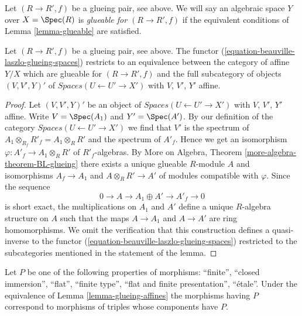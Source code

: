 \noindent
Let $(R \to R', f)$ be a glueing pair, see above.
We will say an algebraic space $Y$ over $X = \Spec(R)$
is {\it glueable for $(R \to R', f)$}
if the equivalent conditions of Lemma \ref{lemma-glueable}
are satisfied.

\begin{lemma}
\label{lemma-glueing-affines}
Let $(R \to R', f)$ be a glueing pair, see above.
The functor (\ref{equation-beauville-laszlo-glueing-spaces})
restricts to an equivalence between the category of affine
$Y/X$ which are glueable for $(R \to R', f)$ and the
full subcategory of objects $(V, V', Y)'$ of
$\textit{Spaces}(U \leftarrow U' \to X')$
with $V$, $V'$, $Y'$ affine.
\end{lemma}

\begin{proof}
Let $(V, V', Y)'$ be an object of
$\textit{Spaces}(U \leftarrow U' \to X')$
with $V$, $V'$, $Y'$ affine.
Write $V = \Spec(A_1)$ and $Y' = \Spec(A')$. By our definition of the
category $\textit{Spaces}(U \leftarrow U' \to X')$ we find that
$V'$ is the spectrum of $A_1 \otimes_{R_f} R'_f = A_1 \otimes_R R'$
and the spectrum of $A'_f$. Hence we get an isomorphism
$\varphi : A'_f \to A_1 \otimes_R R'$ of $R'_f$-algebras.
By More on Algebra, Theorem \ref{more-algebra-theorem-BL-glueing}
there exists a unique glueable $R$-module $A$ and isomorphisms
$A_f \to A_1$ and $A \otimes_R R' \to A'$ of modules compatible with
$\varphi$. Since the sequence
$$
0 \to A \to A_1 \oplus A' \to A'_f \to 0
$$
is short exact, the multiplications on $A_1$ and $A'$ define
a unique $R$-algebra structure on $A$ such that the maps $A \to A_1$
and $A \to A'$ are ring homomorphisms. We omit the verification
that this construction defines a quasi-inverse to the functor
(\ref{equation-beauville-laszlo-glueing-spaces})
restricted to the subcategories mentioned in the statement of the lemma.
\end{proof}

\begin{lemma}
\label{lemma-glueing-affines-etale}
Let $P$ be one of the following properties of morphisms:
``finite'', ``closed immersion'', ``flat'', ``finite type'',
``flat and finite presentation'', ``\'etale''.
Under the equivalence of Lemma \ref{lemma-glueing-affines}
the morphisms having $P$ correspond to morphisms of triples
whose components have $P$.
\end{lemma}

